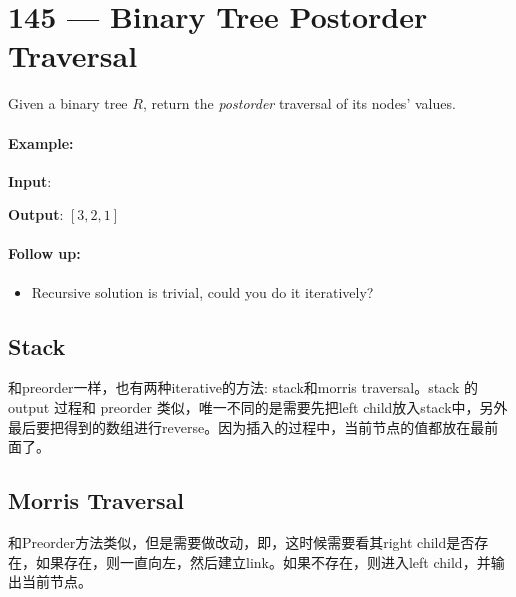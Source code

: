 \section{145 --- Binary Tree Postorder Traversal}
Given a binary tree $R$, return the \textit{postorder} traversal of its nodes' values.
\paragraph{Example:}
\begin{flushleft}
\textbf{Input}:
\begin{figure}[H]
\end{figure}
\textbf{Output}: $[3,2,1]$
\end{flushleft}
\paragraph{Follow up:}
\begin{itemize}
\item Recursive solution is trivial, could you do it iteratively?
\end{itemize}
\subsection{Stack}
和preorder一样，也有两种iterative的方法: stack和morris traversal。stack 的 output 过程和 preorder 类似，唯一不同的是需要先把left child放入stack中，另外最后要把得到的数组进行reverse。因为插入的过程中，当前节点的值都放在最前面了。
\subsection{Morris Traversal}
和Preorder方法类似，但是需要做改动，即，这时候需要看其right child是否存在，如果存在，则一直向左，然后建立link。如果不存在，则进入left child，并输出当前节点。